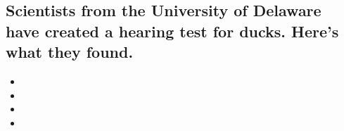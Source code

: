 \hypertarget{scientists-from-the-university-of-delaware-have-created-a-hearing-test-for-ducks-heres-what-they-found-1}{%
\subsection{Scientists from the University of Delaware have created a
hearing test for ducks. Here's what they
found.}\label{scientists-from-the-university-of-delaware-have-created-a-hearing-test-for-ducks-heres-what-they-found-1}}

\begin{itemize}
\item
\item
\item
\item
\end{itemize}

